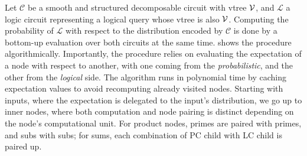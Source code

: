 Let $\mathcal{C}$ be a smooth and structured decomposable circuit with vtree $\operatorname{\mathcal{V}}$, and
$\mathcal{L}$ a logic circuit representing a logical query whose vtree is also $\operatorname{\mathcal{V}}$. Computing
the probability of $\mathcal{L}$ with respect to the distribution encoded by $\mathcal{C}$ is done
by a bottom-up evaluation over both circuits at the same time.  shows the procedure
algorithmically. Importantly, the procedure relies on evaluating the expectation of a node with
respect to another, with one coming from the \emph{probabilistic}, and the other from the
\emph{logical} side. The algorithm runs in polynomial time by caching expectation values to avoid
recomputing already visited nodes. Starting with inputs, where the expectation is delegated to the
input's distribution, we go up to inner nodes, where both computation and node pairing is distinct
depending on the node's computational unit. For product nodes, primes are paired with primes, and
subs with subs; for sums, each combination of PC child with LC child is paired up.

